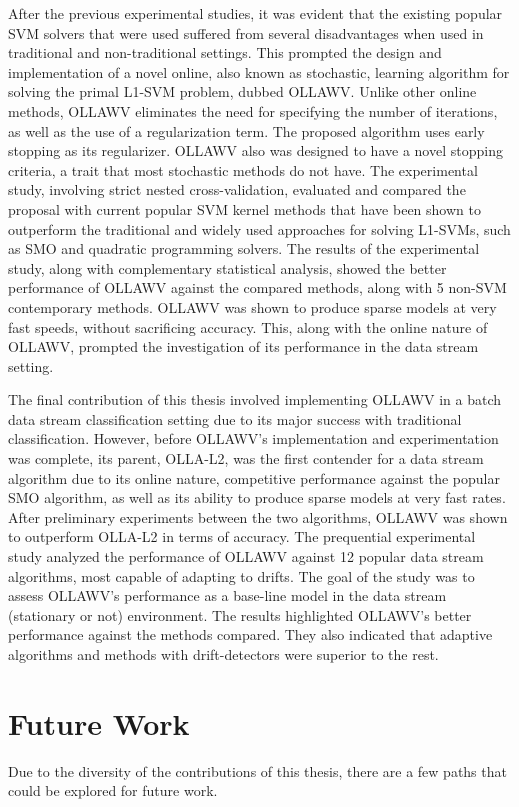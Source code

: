 \documentclass[reqno]{vcuthesis}
\numberwithin{equation}{chapter}
\begin{document}
After the previous experimental studies, it was evident that the existing popular SVM solvers that were used suffered from several disadvantages when used in traditional and non-traditional settings. This prompted the design and implementation of a novel online, also known as stochastic, learning algorithm for solving the primal L1-SVM problem, dubbed OLLAWV. Unlike other online methods, OLLAWV eliminates the need for specifying the number of iterations, as well as the use of a regularization term. The proposed algorithm uses early stopping as its regularizer. OLLAWV also was designed to have a novel stopping criteria, a trait that most stochastic methods do not have. The experimental study, involving strict nested cross-validation, evaluated and compared the proposal with current popular SVM kernel methods that have been shown to outperform the traditional and widely used approaches for solving L1-SVMs, such as SMO and quadratic programming solvers. The results of the experimental study, along with complementary statistical analysis, showed the better performance of OLLAWV against the compared methods, along with 5 non-SVM contemporary methods. OLLAWV was shown to produce sparse models at very fast speeds, without sacrificing accuracy. This, along with the online nature of OLLAWV, prompted the investigation of its performance in the data stream setting. 

The final contribution of this thesis involved implementing OLLAWV in a batch data stream classification setting due to its major success with traditional classification. However, before OLLAWV's implementation and experimentation was complete, its parent, OLLA-L2, was the first contender for a data stream algorithm due to its online nature, competitive performance against the popular SMO algorithm, as well as its ability to produce sparse models at very fast rates. After preliminary experiments between the two algorithms, OLLAWV was shown to outperform OLLA-L2 in terms of accuracy. The prequential experimental study analyzed the performance of OLLAWV against 12 popular data stream algorithms, most capable of adapting to drifts. The goal of the study was to assess OLLAWV's performance as a base-line model in the data stream (stationary or not) environment. The results highlighted OLLAWV's better performance against the methods compared. They also indicated that adaptive algorithms and methods with drift-detectors were superior to the rest.

\chapter{Future Work}
Due to the diversity of the contributions of this thesis, there are a few paths that could be explored for future work. 
\end{document}
